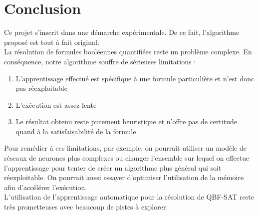 \documentclass{article}
\begin{document}
\section{Conclusion}
Ce projet s'inscrit dans une démarche expérimentale. De ce fait, l'algorithme proposé est tout à fait original.\\
La résolution de formules booléennes quantifiées reste un problème complexe. En conséquence, notre algorithme souffre de sérieuses limitations :
\begin{enumerate}
\item L'apprentissage effectué est spécifique à une formule particulière et n'est donc pas réexploitable
\item L'exécution est assez lente
\item Le résultat obtenu reste purement heuristique et n'offre pas de certitude quand à la satisfaisabilité de la formule
\end{enumerate}
Pour remédier à ces limitations, par exemple, on pourrait utiliser un modèle de réseaux de neurones plus complexes ou changer l'ensemble sur lequel on effectue l'apprentissage pour tenter de créer un algorithme plus général qui soit réexploitable. On pourrait aussi essayer d'optimiser l'utilisation de la mémoire afin d'accélérer l'exécution.\\
L'utilisation de l'apprentissage automatique pour la résolution de QBF-SAT reste très prometteuses avec beaucoup de pistes à explorer.

\newpage
\end{document}
